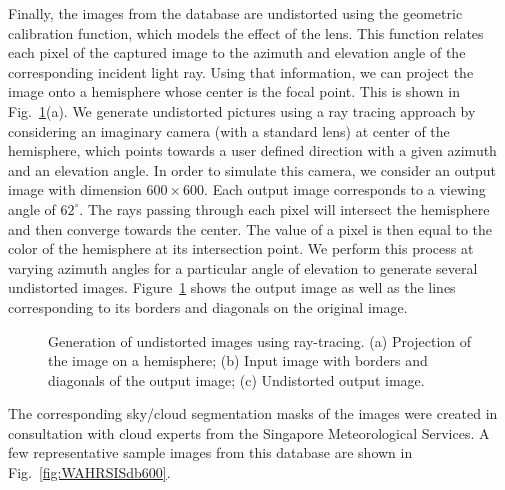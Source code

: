 Finally, the images from the database are undistorted using the geometric calibration function, which models the effect of the lens. This function relates each pixel of the captured image to the azimuth and elevation angle of the corresponding incident light ray. Using that information, we can project the image onto a hemisphere whose center is the focal point. This is shown in Fig.~\ref{fig:undistortion-results}(a). We generate undistorted pictures using a ray tracing approach by considering an imaginary camera (with a standard lens) at center of the hemisphere, which points towards a user defined direction with a given azimuth and an elevation angle. In order to simulate this camera, we consider an output image with dimension $600 \times 600$. Each output image corresponds to a viewing angle of $62^{\circ}$. The rays passing through each pixel will intersect the hemisphere and then converge towards the center. The value of a pixel is then equal to the color of the hemisphere at its intersection point. We perform this process at varying azimuth angles for a particular angle of elevation to generate several undistorted images. Figure~\ref{fig:undistortion-results} shows the output image as well as the lines corresponding to its borders and diagonals on the original image.

\begin{figure}[htbp]
\centering
\caption[Generation of undistorted images using ray-tracing.]{Generation of undistorted images using ray-tracing. (a) Projection of the image on a hemisphere; (b) Input image with borders and diagonals of the output image; (c) Undistorted output image. }\label{fig:undistortion-results}
\end{figure}

The corresponding sky/cloud segmentation masks of the images were created in consultation with cloud experts from the Singapore Meteorological Services. A few representative sample images from this database are shown in Fig.\ \ref{fig:WAHRSISdb600}. 

